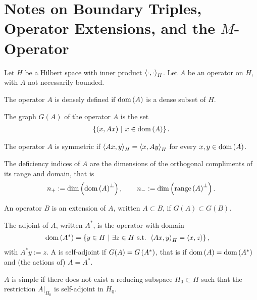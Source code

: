\documentclass[11pt]{report}
\newcommand{\dom}[1]{\mathrm{dom}\bracs{#1}}
\begin{document}
\section{Notes on Boundary Triples, Operator Extensions, and the $M$-Operator}

Let $H$ be a Hilbert space with inner product $\left\langle \cdot , \cdot \right\rangle_H$.
Let $A$ be an operator on $H$, with $A$ not necessarily bounded.
\begin{definition}
	The operator $A$ is densely defined if $\dom{A}$ is a dense subset of $H$.
\end{definition}
\begin{definition}
	The graph $G(A)$ of the operator $A$ is the set 
	\begin{align*}
		\clbracs{(x,Ax) \setVert x\in\dom{A}}.
	\end{align*}
\end{definition}
\begin{definition}[Symmetric]
	The operator $A$ is symmetric if $\left\langle Ax , y \right\rangle_H = \left\langle x , Ay \right\rangle_H$ for every $x,y\in\dom{A}$.
\end{definition}
\begin{definition}
	The deficiency indices of $A$ are the dimensions of the orthogonal compliments of its range and domain, that is
	\begin{align*}
		n_+ := \mathrm{dim}\bracs{\dom{A}^\perp},  \qquad
		n_- := \mathrm{dim}\bracs{\mathrm{range}\bracs{A}^\perp}.
	\end{align*}
\end{definition}
\begin{definition}[Extension]
	An operator $B$ is an extension of $A$, written $A\subset B$, if $G(A)\subset G(B)$.
\end{definition}
\begin{definition}
	The adjoint of $A$, written $A^*$, is the operator with domain
	\begin{align*}
		\dom{A^*} &= \clbracs{y\in H \setVert \exists z\in H \text{ s.t. } \ip{Ax}{y}_H = \ip{x}{z} },
	\end{align*}
	with $A^*y := z$. \newline
	A is self-adjoint if $G(A) = G\left( A^* \right)$, that is if $\dom{A}=\dom{A^*}$ and (the actions of) $A=A^*$.
\end{definition}
\begin{definition}[Simple]
	$A$ is simple if there does not exist a reducing subspace $H_0\subset H$ such that the restriction $A\vert_{H_0}$ is self-adjoint in $H_0$.
\end{definition}
\end{document}

